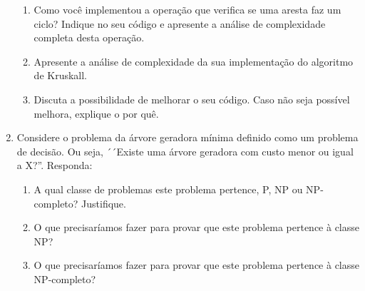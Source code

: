 \documentclass{article}
\begin{document}
\begin{enumerate}
    \begin{enumerate}
        \item Como você implementou a operação que verifica se uma aresta faz um ciclo? Indique no seu código e apresente a análise de complexidade completa desta operação.
        \item Apresente a análise de complexidade da sua implementação do algoritmo de Kruskall.
        \item Discuta a possibilidade de melhorar o seu código. Caso não seja possível melhora, explique o por quê. 
    \end{enumerate}

    \item Considere o problema da árvore geradora mínima definido como um problema de decisão. Ou seja, ´´Existe uma árvore geradora com custo menor ou igual a X?''. Responda:
    
    \begin{enumerate}
        \item A qual classe de problemas este problema pertence, P, NP ou NP-completo? Justifique.
        \item O que precisaríamos fazer para provar que este problema pertence à classe NP?
        \item O que precisaríamos fazer para provar que este problema pertence à classe NP-completo?
    \end{enumerate}

\end{enumerate}


%
%
\end{document}
